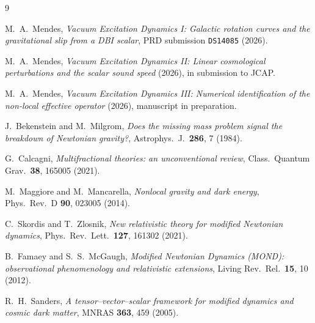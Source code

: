 \documentclass[aps,prd,twocolumn,superscriptaddress,nofootinbib]{revtex4-2}
\begin{document}
\begin{thebibliography}{9}

M.~A.\ Mendes, \emph{Vacuum Excitation Dynamics I: Galactic
rotation curves and the gravitational slip from a DBI scalar},
PRD submission \texttt{DS14085} (2026).

M.~A.\ Mendes, \emph{Vacuum Excitation Dynamics II: Linear
cosmological perturbations and the scalar sound speed} (2026),
in submission to JCAP.

M.~A.\ Mendes, \emph{Vacuum Excitation Dynamics III: Numerical
identification of the non-local effective operator} (2026),
manuscript in preparation.

J.~Bekenstein and M.~Milgrom,
\emph{Does the missing mass problem signal the breakdown of
Newtonian gravity?},
Astrophys.\ J.\ \textbf{286}, 7 (1984).

G.~Calcagni,
\emph{Multifractional theories: an unconventional review},
Class.\ Quantum Grav.\ \textbf{38}, 165005 (2021).

M.~Maggiore and M.~Mancarella,
\emph{Nonlocal gravity and dark energy},
Phys.\ Rev.\ D \textbf{90}, 023005 (2014).

C.~Skordis and T.~Zlosnik,
\emph{New relativistic theory for modified Newtonian dynamics},
Phys.\ Rev.\ Lett.\ \textbf{127}, 161302 (2021).

B.~Famaey and S.~S.\ McGaugh,
\emph{Modified Newtonian Dynamics (MOND): observational
phenomenology and relativistic extensions},
Living Rev.\ Rel.\ \textbf{15}, 10 (2012).

R.~H.\ Sanders,
\emph{A tensor--vector--scalar framework for modified dynamics
and cosmic dark matter},
MNRAS \textbf{363}, 459 (2005).

\end{thebibliography}
\end{document}
